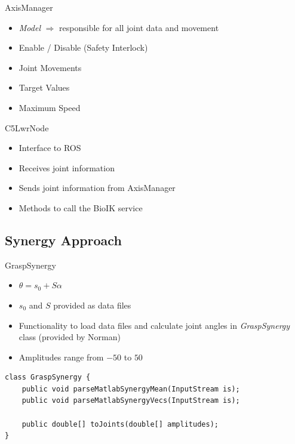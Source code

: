 \documentclass[t]{beamer}
\begin{document}
\begin{frame}{AxisManager}
\begin{itemize}
	\item \textit{Model} $\Rightarrow$ responsible for all joint data and movement
	\item Enable / Disable (Safety Interlock)
	\item Joint Movements
	\item Target Values
	\item Maximum Speed
\end{itemize}
\end{frame}

\begin{frame}{C5LwrNode}
\begin{itemize}
	\item Interface to ROS
	\item Receives joint information
	\item Sends joint information from AxisManager
	\item Methods to call the BioIK service
\end{itemize}
\end{frame}

\subsection{Synergy Approach}

\begin{frame}[fragile]{GraspSynergy}
\begin{itemize}
	\item $\theta = s_0 + S\alpha$
	\item $s_0$ and $S$ provided as data files
	\item Functionality to load data files and calculate joint angles in \textit{GraspSynergy} class (provided by Norman)
	\item Amplitudes range from $-50$ to $50$
\end{itemize}
\begin{lstlisting}
class GraspSynergy {
	public void parseMatlabSynergyMean(InputStream is);
	public void parseMatlabSynergyVecs(InputStream is);
	
	public double[] toJoints(double[] amplitudes);
}
\end{lstlisting}
\end{frame}
\end{document}
